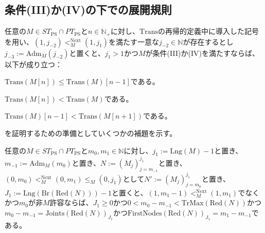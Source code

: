 \documentclass[dvipdfmx,uplatex]{jsarticle}
\theoremstyle{customnonumberbreakfortheorem}
\theoremstyle{customnonumberbreakforproof}
\begin{document}
\subsection{条件(III)か(IV)の下での展開規則}

\begin{proposition}\label{条件(III)か(IV)の下でのTransと基本列の交換関係}
	任意の\(M \in ST_{\textrm{PS}} \cap PT_{\textrm{PS}}\)と\(n \in \mathbb{N}_{+}\)に対し、\(\textrm{Trans}\)の再帰的定義中に導入した記号を用い、\((1,j_{-2}) <_M^{\textrm{Next}} (1,j_1)\)を満たす一意な\(j_{-2} \in \mathbb{N}\)が存在するとし\(j_{-3} := \textrm{Adm}_M(j_{-2})\)と置くと、\(j_1 > 1\)かつ\(M\)が条件(III)か(IV)を満たすならば\footnotemark{}、以下が成り立つ：
	\begin{penumerate}
		\item \(\textrm{Trans}(M[n]) \leq \textrm{Trans}(M)[n-1]\)である。
		\item \(\textrm{Trans}(M[n]) < \textrm{Trans}(M)\)である。
		\item \(\textrm{Trans}(M)[n-1] < \textrm{Trans}(M[n+1])\)である。
	\end{penumerate}
\end{proposition}

を証明するための準備としていくつかの補題を示す。

\begin{lemma}[右端の非許容直系先祖の基本性質]\label{右端の非許容直系先祖の基本性質}
	任意の\(M \in ST_{\textrm{PS}} \cap PT_{\textrm{PS}}\)と\(m_0,m_1 \in \mathbb{N}\)に対し、\(j_1 := \textrm{Lng}(M)-1\)と置き、\(m_{-1} := \textrm{Adm}_M(m_0)\)と置き、\(N := (M_j)_{j=m_{-1}}^{j_1}\)と置き、\((0,m_0) <_M^{\textrm{Next}} (0,m_1) \leq_M (0,j_1)\)として\(N' := (M_j)_{j=m_0}^{j_1}\)と置き、\(J_1 := \textrm{Lng}(\textrm{Br}(\textrm{Red}(N)))-1\)と置くと、\((1,m_1-1) <_M^{\textrm{Next}} (1,m_1)\)でなくかつ\(m_0\)が非\(M\)許容ならば、\(J_1 \geq 0\)かつ\(0 < m_0-m_{-1} < \textrm{TrMax}(\textrm{Red}(N))\)かつ\(m_0-m_{-1} = \textrm{Joints}(\textrm{Red}(N))_{J_1}\)かつ\(\textrm{FirstNodes}(\textrm{Red}(N))_{J_1} = m_1-m_{-1}\)である。
\end{lemma}
\end{document}
